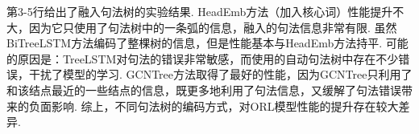 \begin{table}[hb!]
\begin{tabular}{cc c c c  }
    \end{tabular}
\end{table}

第3-5行给出了融入句法树的实验结果. HeadEmb方法（加入核心词）性能提升不大，因为它只使用了句法树中的一条弧的信息，融入的句法信息非常有限. 虽然BiTreeLSTM方法编码了整棵树的信息，但是性能基本与HeadEmb方法持平. 可能的原因是：TreeLSTM对句法的错误非常敏感，而使用的自动句法树中存在不少错误，干扰了模型的学习. GCNTree方法取得了最好的性能，因为GCNTree只利用了和该结点最近的一些结点的信息，既更多地利用了句法信息，又缓解了句法错误带来的负面影响. 综上，不同句法树的编码方式，对ORL模型性能的提升存在较大差异.


